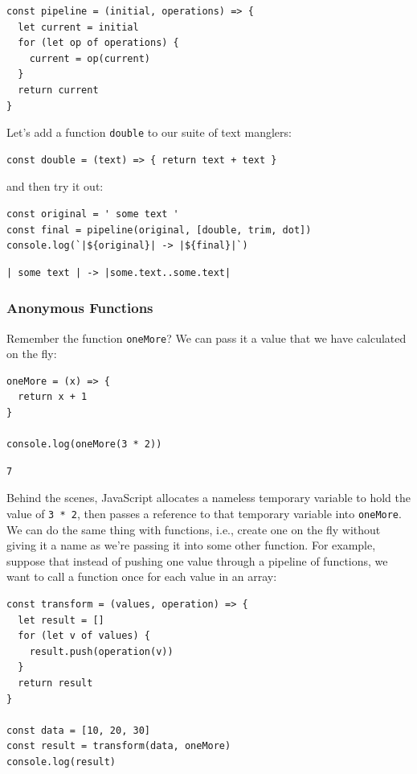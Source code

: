 \begin{verbatim}
const pipeline = (initial, operations) => {
  let current = initial
  for (let op of operations) {
    current = op(current)
  }
  return current
}
\end{verbatim}

Let's add a function \texttt{double} to our suite of text manglers:

\begin{verbatim}
const double = (text) => { return text + text }
\end{verbatim}

and then try it out:

\begin{verbatim}
const original = ' some text '
const final = pipeline(original, [double, trim, dot])
console.log(`|${original}| -> |${final}|`)
\end{verbatim}

\begin{verbatim}
| some text | -> |some.text..some.text|
\end{verbatim}

\subsubsection{Anonymous Functions}\label{s:callbacks-anonymous}

Remember the function \texttt{oneMore}? We can pass it a value that we
have calculated on the fly:

\begin{verbatim}
oneMore = (x) => {
  return x + 1
}

console.log(oneMore(3 * 2))
\end{verbatim}

\begin{verbatim}
7
\end{verbatim}

Behind the scenes, JavaScript allocates a nameless temporary variable to
hold the value of \texttt{3\ *\ 2}, then passes a reference to that
temporary variable into \texttt{oneMore}. We can do the same thing with
functions, i.e., create one on the fly without giving it a name as we're
passing it into some other function. For example, suppose that instead
of pushing one value through a pipeline of functions, we want to call a
function once for each value in an array:

\begin{verbatim}
const transform = (values, operation) => {
  let result = []
  for (let v of values) {
    result.push(operation(v))
  }
  return result
}

const data = [10, 20, 30]
const result = transform(data, oneMore)
console.log(result)
\end{verbatim}

